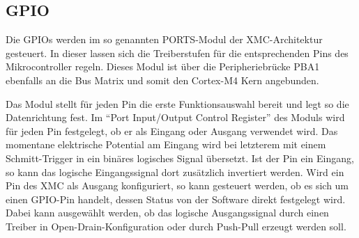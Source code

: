 \subsection{GPIO}
Die \acp{GPIO} werden im so genannten PORTS-Modul der XMC-Architektur gesteuert. In dieser lassen sich die Treiberstufen für die entsprechenden Pins des Mikrocontroller regeln. Dieses Modul ist über die Peripheriebrücke PBA1 ebenfalls an die Bus Matrix  und somit den Cortex-M4 Kern angebunden.  %

Das Modul stellt für jeden Pin die erste Funktionsauswahl bereit und legt so die Datenrichtung fest. Im \enquote{Port Input/Output Control Register} des Moduls wird für jeden Pin festgelegt, ob er als Eingang oder Ausgang verwendet wird. Das momentane elektrische Potential am Eingang wird bei letzterem mit einem Schmitt-Trigger in ein binäres logisches Signal übersetzt. Ist der Pin ein Eingang, so kann das logische Eingangssignal dort zusätzlich invertiert werden. Wird ein Pin des XMC als Ausgang konfiguriert, so kann gesteuert werden, ob es sich um einen \ac{GPIO}-Pin handelt, dessen Status von der Software direkt festgelegt wird. Dabei kann ausgewählt werden, ob das logische Ausgangssignal durch einen Treiber in Open-Drain-Konfiguration oder durch Push-Pull erzeugt werden soll. 

